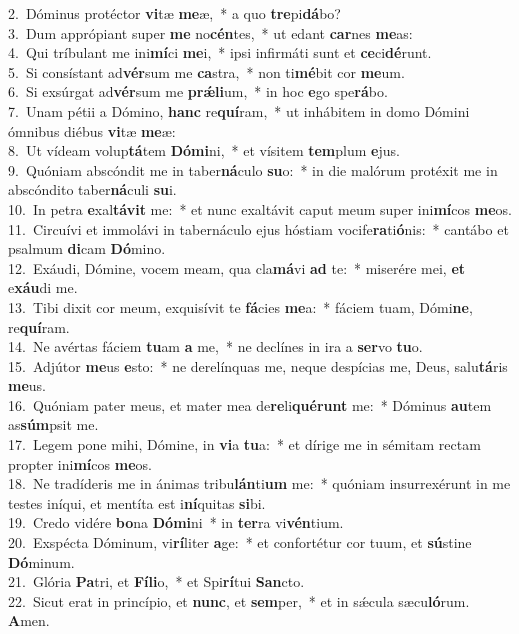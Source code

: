 {2.~}Dóminus protéctor \textbf{vi}tæ \textbf{me}æ,~* a quo \textbf{tre}pi\textbf{dá}bo?\\
{3.~}Dum apprópiant super \textbf{me} no\textbf{cén}tes,~* ut edant \textbf{car}nes \textbf{me}as:\\
{4.~}Qui tríbulant me ini\textbf{mí}ci \textbf{me}i,~* ipsi infirmáti sunt et \textbf{ce}ci\textbf{dé}runt.\\
{5.~}Si consístant ad\textbf{vér}sum me \textbf{ca}stra,~* non ti\textbf{mé}bit cor \textbf{me}um.\\
{6.~}Si exsúrgat ad\textbf{vér}sum me \textbf{prǽ}\textbf{li}um,~* in hoc \textbf{e}go spe\textbf{rá}bo.\\
{7.~}Unam pétii a Dómino, \textbf{hanc} re\textbf{quí}ram,~* ut inhábitem in domo Dómini ómnibus diébus \textbf{vi}tæ \textbf{me}æ:\\
{8.~}Ut vídeam volup\textbf{tá}tem \textbf{Dó}\textbf{mi}ni,~* et vísitem \textbf{tem}plum \textbf{e}jus.\\
{9.~}Quóniam abscóndit me in taber\textbf{ná}culo \textbf{su}o:~* in die malórum protéxit me in abscóndito taber\textbf{ná}culi \textbf{su}i.\\
{10.~}In petra \textbf{e}xal\textbf{tá}\textbf{vit} me:~* et nunc exaltávit caput meum super ini\textbf{mí}cos \textbf{me}os.\\
{11.~}Circuívi et immolávi in tabernáculo ejus hóstiam vocife\textbf{ra}ti\textbf{ó}nis:~* cantábo et psalmum \textbf{di}cam \textbf{Dó}mino.\\
{12.~}Exáudi, Dómine, vocem meam, qua cla\textbf{má}vi \textbf{ad} te:~* miserére mei, \textbf{et} e\textbf{xáu}di me.\\
{13.~}Tibi dixit cor meum, exquisívit te \textbf{fá}cies \textbf{me}a:~* fáciem tuam, Dómi\textbf{ne}, re\textbf{quí}ram.\\
{14.~}Ne avértas fáciem \textbf{tu}am \textbf{a} me,~* ne declínes in ira a \textbf{ser}vo \textbf{tu}o.\\
{15.~}Adjútor \textbf{me}us \textbf{e}sto:~* ne derelínquas me, neque despícias me, Deus, salu\textbf{tá}ris \textbf{me}us.\\
{16.~}Quóniam pater meus, et mater mea de\textbf{re}li\textbf{qué}\textbf{runt} me:~* Dóminus \textbf{au}tem as\textbf{súm}psit me.\\
{17.~}Legem pone mihi, Dómine, in \textbf{vi}a \textbf{tu}a:~* et dírige me in sémitam rectam propter ini\textbf{mí}cos \textbf{me}os.\\
{18.~}Ne tradíderis me in ánimas tribu\textbf{lán}ti\textbf{um} me:~* quóniam insurrexérunt in me testes iníqui, et mentíta est i\textbf{ní}quitas \textbf{si}bi.\\
{19.~}Credo vidére \textbf{bo}na \textbf{Dó}\textbf{mi}ni~* in \textbf{ter}ra vi\textbf{vén}tium.\\
{20.~}Exspécta Dóminum, vi\textbf{rí}liter \textbf{a}ge:~* et confortétur cor tuum, et \textbf{sú}stine \textbf{Dó}minum.\\
{21.~}Glória \textbf{Pa}tri, et \textbf{Fí}\textbf{li}o,~* et Spi\textbf{rí}tui \textbf{San}cto.\\
{22.~}Sicut erat in princípio, et \textbf{nunc}, et \textbf{sem}per,~* et in sǽcula sæcu\textbf{ló}rum. \textbf{A}men.\\
